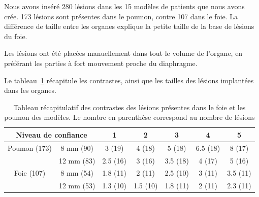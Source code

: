 Nous avons inséré 280 lésions dans les 15 modèles de patients que nous avons crée. 173 lésions sont présentes dans le poumon, contre 107 dans le foie. La différence de taille entre les organes explique la petite taille de la base de lésions du foie. 

Les lésions ont été placées manuellement dans tout le volume de l'organe, en préférant les parties à fort mouvement proche du diaphragme. 

Le tableau~\ref{tab:contrastePoumonFoieRecap} récapitule les contrastes, ainsi que les tailles des lésions implantées dans les organes.
 
\begin{table}
\centering
 \begin{tabular}{|c|c||c|c|c|c|c|} 
\hline
\multicolumn{2}{|c|}{Niveau de confiance}       & 1	  & 2	    & 3	     & 4	& 5	\\
\hline
\hline
Poumon	(173)	& 8 mm (90)	& 3 (19)  & 4 (18)  & 5 (18)  & 6.5 (18)	& 8 (17)\\
\cline{2-7}
		& 12 mm	(83)	& 2.5 (16)& 3 (16)  & 3.5 (18)& 4 (17)	& 5 (16)\\
\hline
Foie 	(107)	& 8 mm (54)		& 1.8 (11)& 2 (11)  & 2.5 (10)& 3 (11)	& 3.5 (11)\\
\cline{2-7}
		& 12 mm	(53)	& 1.3 (10)& 1.5 (10)& 1.8 (11)& 2 (11)  & 2.3 (11)\\
\hline 
 \end{tabular}

\caption[Tableau récapitulatif des lésions]{Tableau récapitulatif des contrastes des lésions présentes dans le foie et les poumon des modèles. Le nombre en parenthèse correspond au nombre de lésions}
\label{tab:contrastePoumonFoieRecap}


\end{table}



